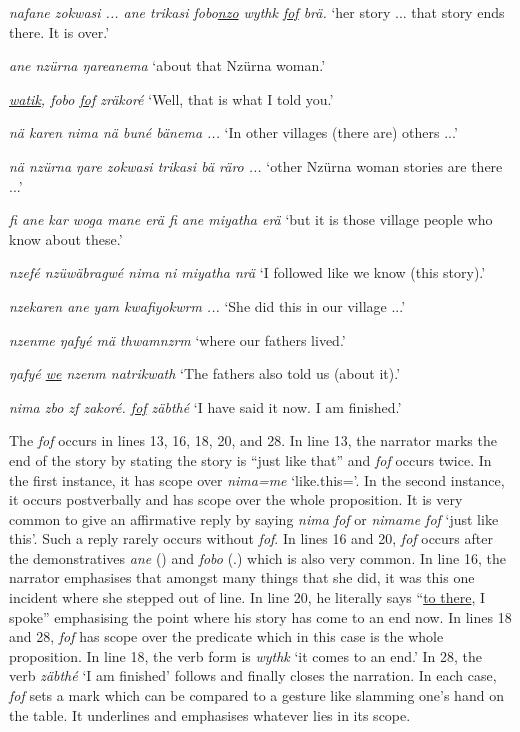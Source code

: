 \begin{exe}
\begin{xlist}
	 \emph{nafane zokwasi ... ane trikasi fobo\uline{nzo} wythk \uline{fof} brä.}
	\trans `her story ... that story ends there. It is over.'

	 \emph{ane nzürna ŋareanema}
	\trans `about that Nzürna woman.'

	 \emph{\uline{watik}, fobo \uline{fof} zräkoré}
	\trans `Well, that is what I told you.'

	 \emph{nä karen nima nä buné bänema ... }
	\trans `In other villages (there are) others ...'

	 \emph{nä nzürna ŋare zokwasi trikasi bä räro ...}
	\trans `other Nzürna woman stories are there ...'

	 \emph{fi ane kar woga mane erä fi ane miyatha erä}
	\trans `but it is those village people who know about these.'

	 \emph{nzefé nzüwäbragwé nima ni miyatha nrä}
	\trans `I followed like we know (this story).'

	 \emph{nzekaren ane yam kwafiyokwrm ...}
	\trans `She did this in our village ...'

	 \emph{nzenme ŋafyé mä thwamnzrm}
	\trans `where our fathers lived.'

	 \emph{ŋafyé \uline{we} nzenm natrikwath}
	\trans `The fathers also told us (about it).'

	 \emph{nima zbo zf zakoré. \uline{fof} zäbthé}
	\trans `I have said it now. I am finished.'
	\end{xlist}
	\label{nzurnatext}
\end{exe}

The  \emph{fof} occurs in lines 13, 16, 18, 20, and 28. In line 13, the narrator marks the end of the story by stating the story is ``just like that'' and \emph{fof} occurs twice. In the first instance, it has scope over \emph{nima=me} `like.this={\Ins}'. In the second instance, it occurs postverbally and has scope over the whole proposition. It is very common to give an affirmative reply by saying \emph{nima fof} or \emph{nimame fof} `just like this'. Such a reply rarely occurs without \emph{fof}. In lines 16 and 20, \emph{fof} occurs after the demonstratives \emph{ane} ({\Dem}) and \emph{fobo} (\Dist.\All) which is also very common. In line 16, the narrator emphasises that amongst many things that she did, it was this one incident where she stepped out of line. In line 20, he literally says ``\uline{to there}, I spoke'' emphasising the point where his story has come to an end now. In lines 18 and 28, \emph{fof} has scope over the predicate which in this case is the whole proposition. In line 18, the verb form is \emph{wythk} `it comes to an end.' In 28, the verb \emph{zäbthé} `I am finished' follows and finally closes the narration. In each case, \emph{fof} sets a mark which can be compared to a gesture like slamming one's hand on the table. It underlines and emphasises whatever lies in its scope.


